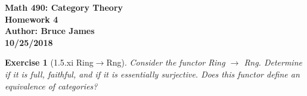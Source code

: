 \documentclass{article}
\newtheorem{lemma}{Exercise}
\begin{document}
	

	\begin{center}
	
{\bf\Large Math 490: Category Theory}\\
\medskip
{\bf Homework 4}\\ 
\medskip
{\bf Author: Bruce James}\\ 
\medskip
{\bf 10/25/2018}\\ 

	\end{center}

\medskip


	\begin{lemma}[1.5.xi Ring$\rightarrow$Rng]
Consider the functor Ring $\rightarrow$ Rng. Determine if it is full, faithful, and if it is essentially surjective. Does this functor define an equivalence of categories?

	\end{lemma}
\end{document}
